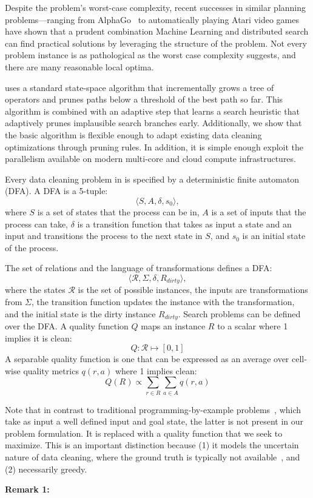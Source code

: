 Despite the problem's worst-case complexity, 
recent successes in similar planning problems---ranging from AlphaGo~\cite{silver2016mastering} to automatically playing Atari video games~\cite{mnih2015human} have shown that a prudent combination Machine Learning and distributed search can find practical solutions by leveraging the structure of the problem. 
Not every problem instance is as pathological as the worst case complexity suggests, and there are many reasonable local optima.

\sys uses a standard state-space algorithm that incrementally grows a tree of operators and prunes paths below a threshold of the best path so far. 
This algorithm is combined with an adaptive step that learns a search heuristic that adaptively prunes implausible search branches early.
Additionally, we show that the basic algorithm is flexible enough to adapt existing data cleaning optimizations through pruning rules.  In addition, it is simple enough exploit the parallelism available on modern multi-core and cloud compute infrastructures.








    Every data cleaning problem in \sys is specified by a deterministic finite automaton (DFA). 
    A DFA is a 5-tuple:
    \[\langle S, A, \delta, s_0\rangle,\]
    where $S$ is a set of states that the process can be in, $A$ is a set of inputs that the process can take, $\delta$ is a transition function that takes as input a state and an input and transitions the process to the next state in $S$, and $s_0$ is an initial state of the process.

    The set of relations and the language of transformations defines a DFA:
    \[\langle \mathcal{R}, \Sigma, \delta, R_{dirty}\rangle, \]
    where the states $\mathcal{R}$ is the set of possible instances, the inputs are transformations from $\Sigma$, the transition function updates the instance with the transformation, and the initial state is the dirty instance $R_{dirty}$. Search problems can be defined over the DFA. 
    A quality function $Q$ maps an instance $R$ to a scalar where 1 implies it is clean:
    \[
    Q: \mathcal{R} \mapsto [0,1]
    \]
    A separable quality function is one that can be expressed as an average over cell-wise quality metrics $q(r,a)$ where 1 implies clean:
    \[
    Q(R) \propto \sum_{r \in R} \sum_{a \in A} q(r,a)
    \]

    Note that in contrast to traditional programming-by-example problems~\cite{}, which take as input a well defined input and goal state, the latter is not present in our problem formulation.  It is replaced with a quality function that we seek to maximize.  This is an important distinction because (1) it models the uncertain nature of data cleaning, where the ground truth is typically not available~\cite{}, and (2) necessarily greedy.

    \vspace{0.5em} \noindent \textbf{Remark 1: } 



\fi







